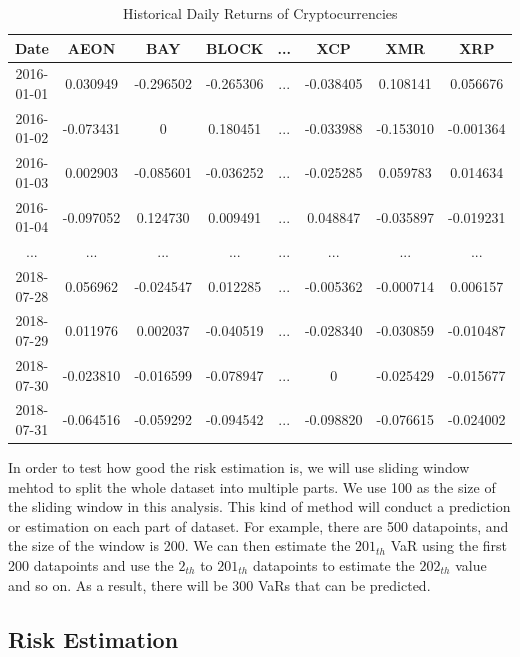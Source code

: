 \documentclass[11pt]{article} %
\theoremstyle{plain}
\theoremstyle{definition}
\begin{document}
{
  \begin{table}[ht]
    \centering
    \scriptsize
    \begin{tabular}{|c|c c c c c c c|}
      \hline
      Date & AEON & BAY & BLOCK & ... & XCP & XMR & XRP \\ [0.5ex]
      \hline
      2016-01-01 & 0.030949 & -0.296502 & -0.265306 & ... & -0.038405 & 0.108141 & 0.056676 \\
      \hline
      2016-01-02 & -0.073431 & 0 & 0.180451 & ... & -0.033988 & -0.153010 & 	-0.001364 \\
      \hline
      2016-01-03 & 0.002903 & -0.085601 & -0.036252 & ... & -0.025285 & 0.059783 & 0.014634 \\
      \hline
      2016-01-04 & -0.097052 & 0.124730 & 0.009491 & ... & 0.048847 & -0.035897 & -0.019231 \\
      \hline
      ... & ... & ... & ... & ... & ... & ... & ... \\
      \hline
      2018-07-28 & 0.056962 & -0.024547 & 0.012285 & ... & -0.005362 & -0.000714 & 0.006157 \\
      \hline
      2018-07-29 & 0.011976 & 0.002037 & -0.040519 & ... & -0.028340 & -0.030859 & -0.010487 \\
      \hline
      2018-07-30 & -0.023810 & -0.016599 & -0.078947 & ... & 0 & -0.025429 & -0.015677 \\
      \hline
      2018-07-31 & -0.064516 & -0.059292 & -0.094542 & ... & -0.098820 & -0.076615 & -0.024002 \\
      \hline
    \end{tabular}
    \caption{Historical Daily Returns of Cryptocurrencies}
    \label{table:drcrypto}
  \end{table}
}

In order to test how good the risk estimation is, we will use sliding window mehtod to split the whole dataset into multiple parts. We use 100 as the size of the sliding window in this analysis. This kind of method will conduct a prediction or estimation on each part of dataset. For example, there are 500 datapoints, and the size of the window is 200. We can then estimate the $201_{th}$ VaR using the first 200 datapoints and use the $2_{th}$ to $201_{th}$ datapoints to estimate the $202_{th}$ value and so on. As a result, there will be 300 VaRs that can be predicted.

\subsection{Risk Estimation}
\end{document}
